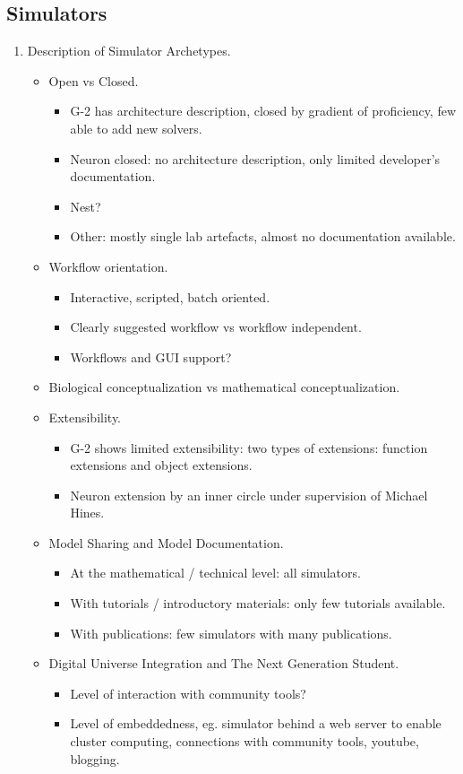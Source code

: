 \documentclass[12pt]{article}
\begin{document}
\subsection{Simulators}

\begin{enumerate}
\item Description of Simulator Archetypes.
  \begin{itemize}
  \item Open vs Closed.
    \begin{itemize}
    \item G-2 has architecture description, closed by gradient of
      proficiency, few able to add new solvers.
    \item Neuron closed: no architecture description, only limited
      developer's documentation.
    \item Nest?
    \item Other: mostly single lab artefacts, almost no documentation
      available.
    \end{itemize}
  \item Workflow orientation.
    \begin{itemize}
    \item Interactive, scripted, batch oriented.
    \item Clearly suggested workflow vs workflow independent.
    \item Workflows and GUI support?
    \end{itemize}
  \item Biological conceptualization vs mathematical
    conceptualization.
  \item Extensibility.
    \begin{itemize}
    \item G-2 shows limited extensibility: two types of extensions:
      function extensions and object extensions.
    \item Neuron extension by an inner circle under supervision of
      Michael Hines.
    \end{itemize}
  \item Model Sharing and Model Documentation.
    \begin{itemize}
    \item At the mathematical / technical level: all simulators.
    \item With tutorials / introductory materials: only few tutorials
      available.
    \item With publications: few simulators with many publications.
    \end{itemize}
  \item Digital Universe Integration and The Next Generation Student.
    \begin{itemize}
    \item Level of interaction with community tools?
    \item Level of embeddedness, eg. simulator behind a web server to
      enable cluster computing, connections with community tools,
      youtube, blogging.
    \end{itemize}
  \end{itemize}
\end{enumerate}
\end{document}
